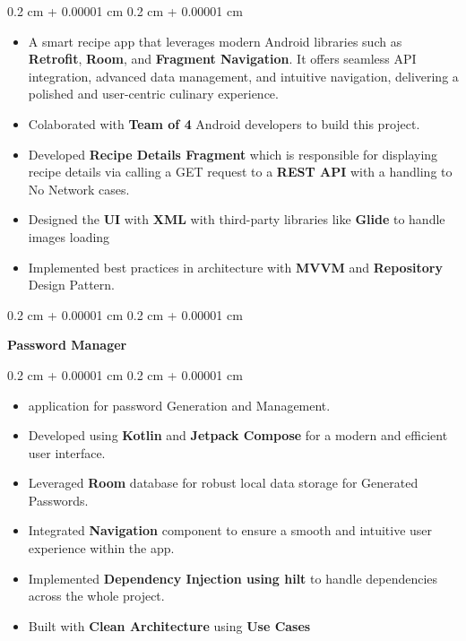 \documentclass[10pt, letterpaper]{article}
\newenvironment{highlights}{
    \begin{itemize}[
        topsep=0.10 cm,
        parsep=0.10 cm,
        partopsep=0pt,
        itemsep=0pt,
        leftmargin=0.4 cm + 10pt
    ]
}{
    \end{itemize}
} %
\newenvironment{onecolentry}{
    \begin{adjustwidth}{
        0.2 cm + 0.00001 cm
    }{
        0.2 cm + 0.00001 cm
    }
}{
    \end{adjustwidth}
} %
\newenvironment{twocolentry}[2][]{
    \onecolentry
    \def\secondColumn{#2}
    \setcolumnwidth{\fill, 4.5 cm}
    \begin{paracol}{2}
}{
    \switchcolumn \raggedleft \secondColumn
    \end{paracol}
    \endonecolentry
} %
\let\hrefWithoutArrow\href
\renewcommand{\href}[2]{\hrefWithoutArrow{#1}{\ifthenelse{\equal{#2}{}}{ }{#2 }\raisebox{.15ex}{\footnotesize \faExternalLink*}}}
\begin{document}
        \vspace{0.10 cm}
        \begin{onecolentry}
            \begin{highlights}
                \item A smart recipe app that leverages modern Android libraries such as \textbf{Retrofit}, \textbf{Room}, and \textbf{Fragment Navigation}. It offers seamless API integration, advanced data management, and intuitive navigation, delivering a polished and user-centric culinary experience.
                \item Colaborated with \textbf{Team of 4} Android developers to build this project.
                \item Developed \textbf{Recipe Details Fragment} which is responsible for displaying recipe details via calling a GET request to a \textbf{REST API} with a handling to No Network cases.
                \item Designed the \textbf{UI} with \textbf{XML} with third-party libraries like \textbf{Glide} to handle images loading
                \item Implemented best practices in architecture with \textbf{MVVM} and \textbf{Repository} Design Pattern.
            \end{highlights}
        \end{onecolentry}


        \vspace{0.2 cm}

        \begin{twocolentry}{
            \href{https://github.com/Boodyahmedhamdy/PasswordManager}{Github}
        }
            \textbf{Password Manager}\end{twocolentry}

        \vspace{0.10 cm}
        \begin{onecolentry}
            \begin{highlights}
                \item application for password Generation and Management.
                \item Developed using \textbf{Kotlin} and \textbf{Jetpack Compose} for a modern and efficient user interface.
                \item Leveraged \textbf{Room} database for robust local data storage for Generated Passwords.
                \item Integrated \textbf{Navigation} component to ensure a smooth and intuitive user experience within the app.
                \item Implemented \textbf{Dependency Injection using hilt} to handle dependencies across the whole project.
                \item Built with \textbf{Clean Architecture} using \textbf{Use Cases}
            \end{highlights}
        \end{onecolentry}
\end{document}
